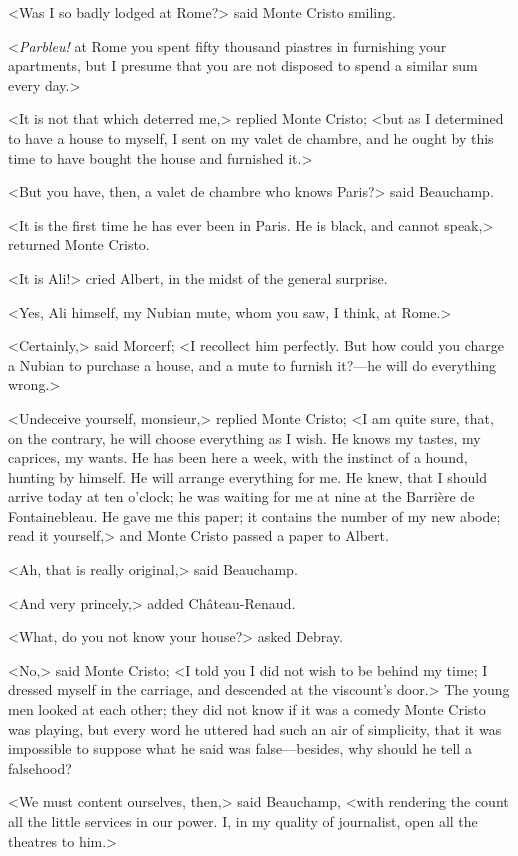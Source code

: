  <Was I so badly lodged at Rome?> said Monte Cristo smiling. 

 <\textit{Parbleu!} at Rome you spent fifty thousand piastres in furnishing your apartments, but I presume that you are not disposed to spend a similar sum every day.> 

 <It is not that which deterred me,> replied Monte Cristo; <but as I determined to have a house to myself, I sent on my valet de chambre, and he ought by this time to have bought the house and furnished it.> 

 <But you have, then, a valet de chambre who knows Paris?> said Beauchamp. 

 <It is the first time he has ever been in Paris. He is black, and cannot speak,> returned Monte Cristo. 

 <It is Ali!> cried Albert, in the midst of the general surprise. 

 <Yes, Ali himself, my Nubian mute, whom you saw, I think, at Rome.> 

 <Certainly,> said Morcerf; <I recollect him perfectly. But how could you charge a Nubian to purchase a house, and a mute to furnish it?—he will do everything wrong.> 

 <Undeceive yourself, monsieur,> replied Monte Cristo; <I am quite sure, that, on the contrary, he will choose everything as I wish. He knows my tastes, my caprices, my wants. He has been here a week, with the instinct of a hound, hunting by himself. He will arrange everything for me. He knew, that I should arrive today at ten o'clock; he was waiting for me at nine at the Barrière de Fontainebleau. He gave me this paper; it contains the number of my new abode; read it yourself,> and Monte Cristo passed a paper to Albert. 

 <Ah, that is really original,> said Beauchamp. 

 <And very princely,> added Château-Renaud. 

 <What, do you not know your house?> asked Debray. 

 <No,> said Monte Cristo; <I told you I did not wish to be behind my time; I dressed myself in the carriage, and descended at the viscount's door.> The young men looked at each other; they did not know if it was a comedy Monte Cristo was playing, but every word he uttered had such an air of simplicity, that it was impossible to suppose what he said was false—besides, why should he tell a falsehood? 

 <We must content ourselves, then,> said Beauchamp, <with rendering the count all the little services in our power. I, in my quality of journalist, open all the theatres to him.> 

